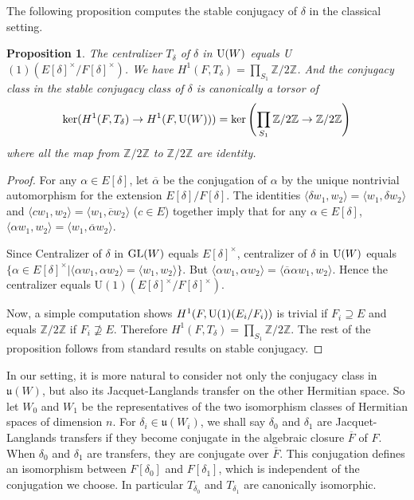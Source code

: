 \documentclass[11pt, oneside,reqno]{amsart}   	%
\newtheorem{proposition}[theorem]{Proposition}
\begin{document}
The following proposition computes the stable conjugacy of $\delta$ in the classical setting.

\begin{proposition}
The centralizer $T_\delta$ of $\delta$ in $\textup{U}(W)$ equals \textup{U}$(1)(E[\delta]^\times/F[\delta]^\times)$. We have $H^1(F, T_\delta)=\prod_{S_1}\mathbb{Z}/2\mathbb{Z}$. And the conjugacy class in the stable conjugacy class of $\delta$ is canonically a torsor of $$\textup{ker}(H^1(F, T_\delta) \rightarrow H^1(F,\textup{U}(W)))= \textup{ker}\left(\prod_{S_1}\mathbb{Z}/2\mathbb{Z} \rightarrow \mathbb{Z}/2\mathbb{Z}\right)$$ where all the map from $\mathbb{Z}/2\mathbb{Z}$ to $\mathbb{Z}/2\mathbb{Z}$ are identity.
\end{proposition}
\begin{proof}

For any $\alpha \in E[\delta]$, let $\overline{\alpha}$ be the conjugation of $\alpha$ by the unique nontrivial automorphism for the extension $E[\delta]/F[\delta]$. The identities $\langle \delta w_1,w_2 \rangle=\langle w_1,\delta w_2 \rangle$ and $\langle cw_1,w_2 \rangle=\langle w_1,\overline{c}w_2 \rangle$ ($c \in E$) together imply that for any $\alpha \in E[\delta]$, $ \langle \alpha w_1, w_2 \rangle= \langle w_1,\overline{\alpha}w_2 \rangle$.

Since Centralizer of $\delta$ in $\textup{GL}(W)$ equals $E[\delta]^\times$,  centralizer of $\delta$ in $\textup{U}(W)$ equals $\{\alpha \in E[\delta]^\times| \langle \alpha w_1, \alpha w_2 \rangle = \langle w_1,w_2 \rangle\}$. But $\langle \alpha w_1, \alpha w_2 \rangle=\langle \overline{\alpha} \alpha w_1,  w_2 \rangle$. Hence the centralizer equals U$(1)(E[\delta]^\times/F[\delta]^\times)$.

Now, a simple computation shows $H^1(F,\textup{U}(1)(E_i/F_i))$ is trivial if $F_i \supseteq E$ and equals $\mathbb{Z}/2\mathbb{Z}$ if $F_i \nsupseteq E$. Therefore $H^1(F, T_\delta)=\prod_{S_1}\mathbb{Z}/2\mathbb{Z}$. The rest of the proposition follows from standard results on stable conjugacy.

\end{proof}

In our setting, it is more natural to consider not only the conjugacy class in $\mathfrak{u}(W)$, but also its Jacquet-Langlands transfer on the other Hermitian space. So let $W_0$ and $W_1$ be the representatives of the two isomorphism classes of Hermitian spaces of dimension $n$. For $\delta_i \in \mathfrak{u}(W_i)$, we shall say $\delta_0$ and $\delta_1$ are Jacquet-Langlands transfers if they become conjugate in the algebraic closure $\overline{F}$ of $F$. When $\delta_0$ and $\delta_1$ are transfers, they are conjugate over $\overline{F}$. This conjugation defines an isomorphism between $F[\delta_0]$ and $F[\delta_1]$, which is independent of the conjugation we choose. In particular $T_{\delta_0}$ and $T_{\delta_1}$
are canonically isomorphic.
\end{document}
